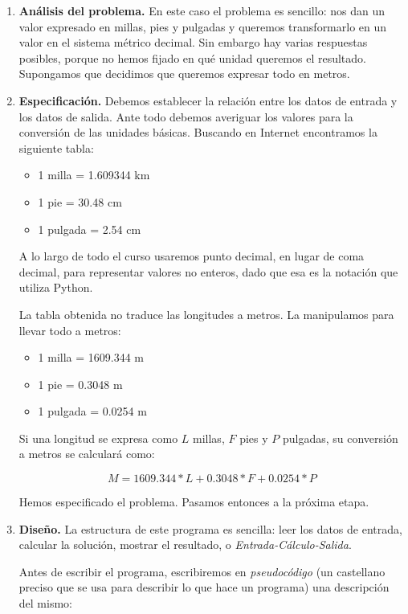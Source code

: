\begin{enumerate}
\item {\bf Análisis del problema.} En este caso el problema es
sencillo: nos dan un valor expresado en millas, pies y pulgadas y
queremos transformarlo en un valor en el sistema métrico decimal.
Sin embargo hay varias respuestas posibles, porque no hemos fijado
en qué unidad queremos el resultado. Supongamos que decidimos que
queremos expresar todo en metros.

\item {\bf Especificación.} Debemos establecer la relación entre
los datos de entrada y los datos de salida. Ante todo debemos
averiguar los valores para la conversión de las unidades básicas.
Buscando en Internet encontramos la siguiente tabla:

\begin{itemize}
\item 1 milla = 1.609344 km
\item 1 pie = 30.48 cm
\item 1 pulgada = 2.54 cm
\end{itemize}

\begin{atencion}
A lo largo de todo el curso usaremos punto decimal,
en lugar de coma decimal, para representar valores no enteros,
dado que esa es la notación que utiliza Python.
\end{atencion}

La tabla obtenida no traduce las longitudes a metros. La manipulamos para
llevar todo a metros:

\begin{itemize}
\item 1 milla = 1609.344 m
\item 1 pie = 0.3048 m
\item 1 pulgada = 0.0254 m
\end{itemize}

Si una longitud se expresa como $L$ millas, $F$ pies y $P$ pulgadas, su
conversión a metros se calculará como:

$$
M = 1609.344 * L + 0.3048 * F + 0.0254 * P
$$

Hemos especificado el problema. Pasamos entonces a la próxima etapa.

\item {\bf Diseño.} La estructura de este programa es sencilla:
leer los datos de entrada, calcular la solución, mostrar el
resultado, o {\it Entrada-Cálculo-Salida}.

Antes de escribir el programa, escribiremos en {\it pseudocódigo}
(un castellano preciso que se usa para describir lo que hace un
programa) una descripción del mismo:


\end{enumerate}
